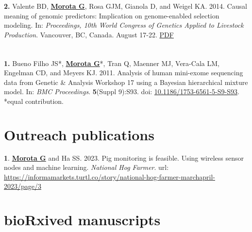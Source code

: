\documentclass[margin,line,10pt]{res}
\newenvironment{list1}{
  \begin{list}{\ding{113}}{%
      \setlength{\itemsep}{0in}
      \setlength{\parsep}{0in} \setlength{\parskip}{0in}
      \setlength{\topsep}{0in} \setlength{\partopsep}{0in} 
      \setlength{\leftmargin}{0.17in}}}{\end{list}}
\begin{document}
\begin{resume}
\begin{list1}
\vspace{0.5cm}

\item [\bf{2}.] Valente BD, {\bf \underline{Morota G}}, Rosa GJM, Gianola D, and  Weigel KA. 2014. 
Causal meaning of genomic predictors: Implication on genome-enabled selection modeling. In: \emph{Proceedings, 10th World Congress of Genetics Applied to Livestock Production}. Vancouver, BC, Canada. August 17-22. 
\textcolor{blue}{\href{http://www.morotalab.org/publications/pdf/valente2014WCGALP.pdf}{PDF}}
\end{list1}


\section{}
\begin{list1}
\item [\bf{1}.] Bueno Filho JS*, {\bf \underline{Morota G}}*, Tran Q, Maenner MJ, Vera-Cala LM, Engelman CD, and Meyers KJ. 2011. Analysis of human mini-exome sequencing data from Genetic \& Analysis Workshop 17 using a  Bayesian hierarchical mixture model. In: \emph{BMC Proceedings}. {\bf 5}(Suppl 9):S93. doi: \textcolor{blue}{\href{http://dx.doi.org/10.1186/1753-6561-5-S9-S93}{10.1186/1753-6561-5-S9-S93}}. *equal contribution.   
\end{list1}



\vspace{1.0cm}
\section{\sc Outreach publications}

\begin{list1}

  \item [{\bf 1}.] \textbf{\underline{Morota G}} and Ha SS. 2023. Pig monitoring is feasible. Using wireless sensor nodes and machine learning. \emph{National Hog Farmer}. url: \textcolor{blue}{\href{https://informamarkets.turtl.co/story/national-hog-farmer-marchapril-2023/page/3}{https://informamarkets.turtl.co/story/national-hog-farmer-marchapril-2023/page/3}}

\end{list1}




\vspace{1.0cm}
\section{\sc bioRxived manuscripts}


\end{resume}
\end{document}
